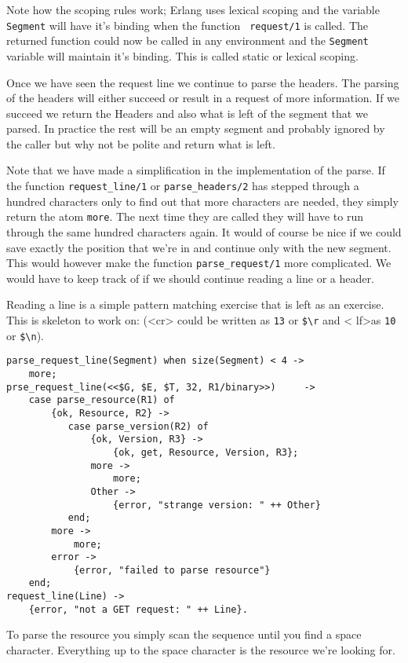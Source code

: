\documentclass[a4paper,dvips,11pt]{article}
\begin{document}
Note how the scoping rules work; Erlang uses lexical scoping and the
variable {\tt Segment} will have it's binding when the function {\tt
  request/1} is called. The returned function could now be called in
any environment and the {\tt Segment} variable will maintain it's
binding. This is called static or lexical scoping. 

Once we have seen the request line we continue to parse the
headers. The parsing of the headers will either succeed or result in a
request of more information. If we succeed we return the Headers and
also what is left of the segment that we parsed. In practice the rest
will be an empty segment and probably ignored by the caller but why
not be polite and return what is left.

Note that we have made a simplification in the implementation of the
parse. If the function {\tt request\_line/1} or {\tt parse\_headers/2} has stepped
through a hundred characters only to find out that more characters are
needed, they simply return the atom {\tt more}. The next time they are
called they will have to run through the same hundred characters
again. It would of course be nice if we could save exactly the
position that we're in and continue only with the new segment. This
would however make the function {\tt parse\_request/1} more complicated. We
would have to keep track of if we should continue reading a line or a
header. 

Reading a line is a simple pattern matching exercise that is left as
an exercise. This is skeleton to work on: (\textless cr\textgreater
could be written as {\tt 13} or {\tt \$\textbackslash r} and \textless
lf\textgreater as {\tt 10} or {\tt \$\textbackslash n}). 

\begin{verbatim}
parse_request_line(Segment) when size(Segment) < 4 ->
    more;
prse_request_line(<<$G, $E, $T, 32, R1/binary>>)     ->
    case parse_resource(R1) of
        {ok, Resource, R2} ->
           case parse_version(R2) of 
               {ok, Version, R3} ->
                   {ok, get, Resource, Version, R3};
               more ->
                   more;
               Other ->
                   {error, "strange version: " ++ Other}
           end;
        more ->
            more;
        error ->
            {error, "failed to parse resource"}
    end;
request_line(Line) ->
    {error, "not a GET request: " ++ Line}.
\end{verbatim}

To parse the resource you simply scan the sequence until you find a
space character. Everything up to the space character is the resource
we're looking for.
\end{document}
